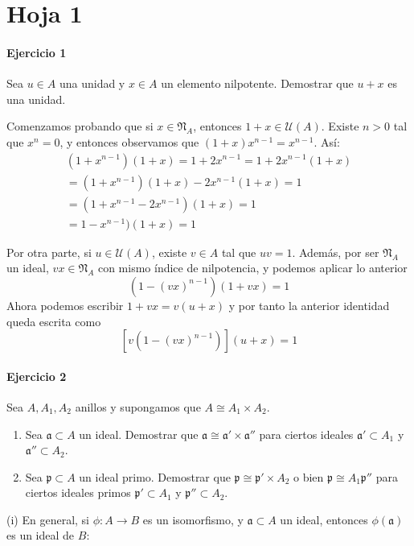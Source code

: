 \documentclass[../main.tex]{subfiles}
\begin{document}
\section{Hoja 1}

\paragraph{Ejercicio 1} Sea $u\in A$ una unidad y $x\in A$ un elemento nilpotente. Demostrar que $u+x$ es una unidad.

Comenzamos probando que si $x\in \mathfrak N_A$, entonces $1+x\in \mathcal U(A)$. Existe $n>0$ tal que $x^n=0$, y entonces observamos que $(1+x)x^{n-1}=x^{n-1}$. Así:
\begin{multline}
(1+x^{n-1})(1+x) = 1+2x^{n-1} =1+2x^{n-1}(1+x)\\
=(1+x^{n-1})(1+x)-2x^{n-1}(1+x)=1\\
=(1+x^{n-1}-2x^{n-1})(1+x)=1\\
=1-x^{n-1})(1+x)=1
\end{multline}

Por otra parte, si $u\in \mathcal U(A)$, existe $v\in A$ tal que $uv=1$. Además, por ser $\mathfrak N_A$ un ideal, $vx \in \mathfrak N_A$ con mismo índice de nilpotencia, y podemos aplicar lo anterior
$$
(1-(vx)^{n-1})(1+vx)=1
$$
Ahora podemos escribir $1+vx = v(u+x)$ y por tanto la anterior identidad queda escrita como
$$
[v(1-(vx)^{n-1})](u+x)=1
$$


\paragraph{Ejercicio 2} Sea $A,A_1,A_2$ anillos y supongamos que $A\cong A_1\times A_2$.
\begin{enumerate}[label=(\roman*)]
    \item Sea $\mathfrak a \subset A$ un ideal. Demostrar que $\mathfrak a \cong \mathfrak a' \times \mathfrak a''$ para ciertos ideales $\mathfrak a' \subset A_1$ y $\mathfrak a'' \subset A_2$.
    \item Sea $\mathfrak p \subset A$ un ideal primo. Demostrar que $\mathfrak p \cong \mathfrak  p' \times A_2$ o bien $\mathfrak p \cong A_1 \mathfrak p''$ para ciertos ideales primos $\mathfrak p' \subset A_1$ y $\mathfrak p'' \subset A_2$.
\end{enumerate}

(i) En general, si $\phi:A\to B$ es un isomorfismo, y $\mathfrak a \subset A$ un ideal, entonces $\phi(\mathfrak a)$ es un ideal de $B$:
\end{document}
